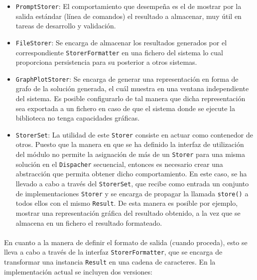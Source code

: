 \documentclass{subfiles}
\begin{document}
          \begin{itemize}

            \item \texttt{PromptStorer}: El comportamiento que desempeña es el de mostrar por la salida estándar (línea de comandos) el resultado a almacenar, muy útil en tareas de desarrollo y validación.

            \item \texttt{FileStorer}: Se encarga de almacenar los resultados generados por el correspondiente \texttt{StorerFormatter} en una fichero del sistema lo cual proporciona persistencia para su posterior a otros sistemas.

            \item \texttt{GraphPlotStorer}: Se encarga de generar una representación en forma de grafo de la solución generada, el cuál muestra en una ventana independiente del sistema. Es posible configurarlo de tal manera que dicha representación sea exportada a un fichero en caso de que el sistema donde se ejecute la biblioteca no tenga capacidades gráficas.

            \item \texttt{StorerSet}: La utilidad de este \texttt{Storer} consiste en actuar como contenedor de otros. Puesto que la manera en que se ha definido la interfaz de utilización del módulo no permite la asignación de más de un \texttt{Storer} para una misma solución en el \texttt{Dispacher} secuencial, entonces es necesario crear una abstracción que permita obtener dicho comportamiento. En este caso, se ha llevado a cabo a través del \texttt{StorerSet}, que recibe como entrada un conjunto de implementaciones \texttt{Storer} y se encarga de propagar la llamada \verb|store()| a todos ellos con el mismo \texttt{Result}. De esta manera es posible por ejemplo, mostrar una representación gráfica del resultado obtenido, a la vez que se almacena en un fichero el resultado formateado.

          \end{itemize}

          \paragraph{}
          En cuanto a la manera de definir el formato de salida (cuando proceda), esto se lleva a cabo a través de la interfaz \texttt{StorerFormatter}, que se encarga de transformar una instancia \texttt{Result} en una cadena de caracteres. En la implementación actual se incluyen dos versiones:
\end{document}
